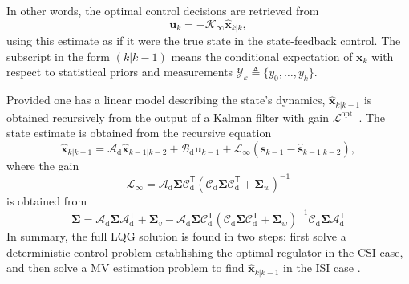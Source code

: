 \documentclass[a4paper,12pt]{article}
\newcommand{\T}{\mathsf{T}} %
\newcommand{\0}{\mathsf{0}} %
\newcommand{\Lkal}{\mathcal{L}_{\infty}} %
\newcommand{\K}{\mathcal{K}_{\infty}} %
\newcommand{\CovMat}{\boldsymbol{\Sigma}} %
\newcommand{\svec}{{\mathbf{s}}}
\newcommand{\xvec}{{\mathbf{x}}}
\newcommand{\uvec}{{\mathbf{u}}}
\begin{document}
        In other words, the optimal control decisions are retrieved from   
        \begin{equation}\label{eq:u_k_optimal_est}
          \uvec_k = -\K \widehat{\xvec}_{k|k} ,
        \end{equation}
        using this estimate as if it were the true state in the
        state-feedback control. The subscript in the form $(k|k-1)$ means the
        conditional expectation of $\xvec_{k}$ with respect
        to statistical priors and measurements $\mathcal{Y}_k \triangleq\{y_{0},\ldots
        ,y_{k}\}$.

        Provided one has a linear model describing the state's
        dynamics, $\widehat{\xvec}_{k|k-1}$ is obtained recursively from the
        output of a Kalman
        filter
        with gain $\mathcal{L}^{\text{opt}}$~\cite{andersonmoore_optimalcontrolLQG05}.
        The state estimate is obtained from the recursive equation
        \begin{equation}\label{eq:kalman_state_prediction}
          \widehat{\xvec}_{k|k-1} = 
          \mathcal{A}_\mathrm{d}\widehat{\xvec}_{k-1|k-2}+\mathcal{B}_\mathrm{d}
          \uvec_{k-1}+\Lkal\left(\svec_{k-1}-\widehat{\svec}_{k-1|k-2}\right) ,
        \end{equation}
        where the gain
\begin{equation}\label{eq:KalmanGain}
          \Lkal	= 
          \mathcal{A}_\mathrm{d} \CovMat\mathcal{C}_\mathrm{d}^\T \left(\mathcal{C}_\mathrm{d}
            \CovMat\mathcal{C}_\mathrm{d}^\T + \CovMat_w\right)^{-1} 
        \end{equation}
        is obtained from
        \begin{equation}\label{eq:ARE}
          \CovMat = \mathcal{A}_\mathrm{d} \CovMat\mathcal{A}_\mathrm{d}^\T + \CovMat_v - \mathcal{A}_\mathrm{d} \CovMat\mathcal{C}_\mathrm{d}^\T\left(\mathcal{C}_\mathrm{d} \CovMat\mathcal{C}_\mathrm{d}^\T + \CovMat_w\right)^{-1}\mathcal{C}_\mathrm{d}\CovMat \mathcal{A}_\mathrm{d}^\T
        \end{equation}
        In summary, the full LQG
        solution is found in two steps: first solve a deterministic control
        problem establishing the optimal regulator in the CSI case, and then
        solve a MV estimation problem to find $\widehat{\xvec}_{k|k-1}$ in the
        ISI case %
        .
        
\end{document}
